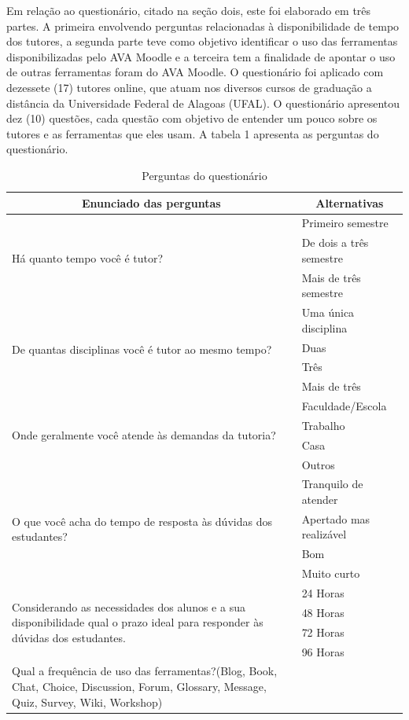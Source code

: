 \documentclass[12pt]{article}
\begin{document}
Em relação ao questionário, citado na seção dois, este foi elaborado em três partes. A primeira envolvendo perguntas relacionadas à disponibilidade de tempo dos tutores, a segunda parte teve como objetivo identificar o uso das ferramentas disponibilizadas pelo AVA Moodle e a terceira tem a finalidade de apontar o uso de outras ferramentas foram do AVA Moodle. O questionário foi aplicado com dezessete (17) tutores online, que atuam nos diversos cursos de graduação a distância da Universidade Federal de Alagoas (UFAL). O questionário apresentou dez (10) questões, cada questão com objetivo de entender um pouco sobre os tutores e as ferramentas que eles usam. A tabela 1 apresenta as perguntas do questionário. 
\begin{table}[!htpb]
 \centering
	\caption{Perguntas do questionário}
\begin{tabular}{|l|l|} \hline
\multicolumn{1}{|c|}{Enunciado das perguntas} & \multicolumn{1}{c|}{Alternativas} \\ \hline
\multirow{3}{9cm}{Há quanto tempo você é tutor?}  
& Primeiro semestre\\
& De dois a três semestre\\ 
& Mais de três semestre \\ \hline
\multirow{4}{9cm}{De quantas disciplinas você é tutor ao mesmo tempo?} 
& Uma única disciplina\\
& Duas \\
& Três \\
& Mais de três \\ \hline
\multirow{4}{9cm}{Onde geralmente você atende às demandas da tutoria?}
& Faculdade/Escola\\
& Trabalho \\
& Casa \\
& Outros \\ \hline
\multirow{4}{9cm}{O que você acha do tempo de resposta às dúvidas dos estudantes?}
& Tranquilo de atender\\
& Apertado mas realizável \\
& Bom \\
& Muito curto \\ \hline
\multirow{4}{9cm}{Considerando as necessidades dos alunos e a sua disponibilidade qual o prazo ideal para responder às dúvidas dos estudantes.}
& 24 Horas\\
& 48 Horas \\
& 72 Horas \\
& 96 Horas \\ \hline
\multirow{4}{9cm}{Qual a frequência de uso das ferramentas?(Blog, Book, Chat, Choice, Discussion, Forum, Glossary, Message, Quiz, Survey, Wiki, Workshop)}

\end{tabular}
\end{table}
\end{document}
